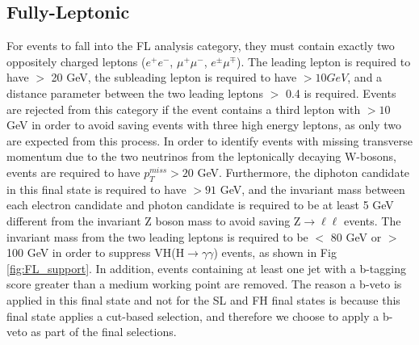 \subsection{Fully-Leptonic} \label{sec:FullyLeptonicEventSelections}


For events to fall into the FL analysis category, they must contain exactly two oppositely charged leptons ($e^{+}e^{-}$, $\mu^{+}\mu^{-}$, $e^{\pm}\mu^{\mp}$).
The leading \pt lepton is required to have \pt $>$ 20 GeV, the subleading lepton is required to have \pt $> 10GeV$, and a distance parameter between the two leading \pt leptons $>$ 0.4 is required.
Events are rejected from this category if the event contains a third lepton with \pt $> 10$ GeV in order to avoid saving events with three high energy leptons, as only two 
are expected from this process. In order to identify events with missing transverse momentum due to the two neutrinos from the 
leptonically decaying W-bosons, events are required to have $p_T^{miss} > 20$ GeV. Furthermore, the diphoton candidate in this final state is required to have \pt $> 91$ GeV, 
and the invariant mass between each electron candidate and photon candidate is required to be at least 5 GeV different from the invariant Z boson mass to avoid saving Z$\rightarrow\ell\ell$ events. The invariant mass 
from the two leading leptons is required to be $<$ 80 GeV or $>$ 100 GeV in order to suppress VH(H$\rightarrow\gamma\gamma$) events, as shown in Fig \ref{fig:FL_support}. In addition, events containing at least one jet 
with a b-tagging score greater than a medium working point are removed. The reason a b-veto is applied in this final state and not for the SL and FH final states is because this final state applies 
a cut-based selection, and therefore we choose to apply a b-veto as part of the final selections. 


